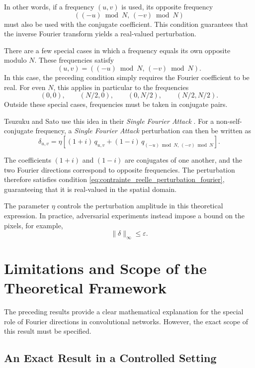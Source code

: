 In other words, if a frequency \((u,v)\) is used, its opposite frequency
\[
    ((-u)\bmod N,\,(-v)\bmod N)
\]
must also be used with the conjugate coefficient. This condition guarantees that the inverse Fourier transform yields a real-valued perturbation.

There are a few special cases in which a frequency equals its own opposite modulo $N$.
These frequencies satisfy
\[
    (u,v)
    =
    ((-u)\bmod N,\,(-v)\bmod N).
\]
In this case, the preceding condition simply requires the Fourier coefficient to be real. For
even $N$, this applies in particular to the frequencies
\[
    (0,0),
    \qquad
    (N/2,0),
    \qquad
    (0,N/2),
    \qquad
    (N/2,N/2).
\]
Outside these special cases, frequencies must be taken in conjugate pairs.

Tsuzuku and Sato use this idea in their \textit{Single Fourier Attack}
\cite{tsuzuku2019structural}. 
For a non-self-conjugate frequency, a \textit{Single Fourier Attack} perturbation
can then be written as
\begin{equation}
    \delta_{u,v}
    =
    \eta
    \left[
        (1+i)\,q_{u,v}
        +
        (1-i)\,q_{(-u)\bmod N,\,(-v)\bmod N}
    \right].
    \label{eq:sfa_perturbation_fourier}
\end{equation}

The coefficients $(1+i)$ and $(1-i)$ are conjugates of one another, and the two Fourier directions
correspond to opposite frequencies. The perturbation therefore satisfies condition
\eqref{eq:contrainte_reelle_perturbation_fourier}, guaranteeing that it is real-valued in the spatial domain.

The parameter $\eta$ controls the perturbation amplitude in this theoretical expression. In practice,
adversarial experiments instead impose a bound on the pixels, for example,
\[
    \|\delta\|_\infty \leq \varepsilon.
\]

\section{Limitations and Scope of the Theoretical Framework}

The preceding results provide a clear mathematical explanation for the special role
of Fourier directions in convolutional networks. However, the exact scope
of this result must be specified.

\subsection{An Exact Result in a Controlled Setting}

